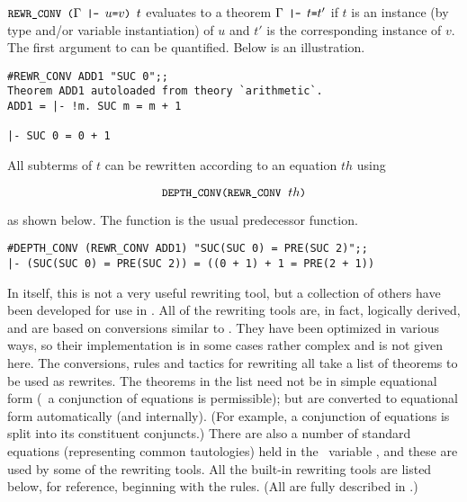 \noindent $\ml{REWR\_CONV (}\Gamma\ml{ |- }u \ml{=}v\ml{) }t$ evaluates to a
theorem $\Gamma\ml{ |- }t\ml{=}t'$ 
if $t$ is an instance (by type and/or variable instantiation)
of $u$ and $t'$ is the corresponding instance of $v$. 
The first argument to  can be quantified.
Below is an illustration.

\setcounter{sessioncount}{1}
\begin{session}\begin{verbatim}
#REWR_CONV ADD1 "SUC 0";;
Theorem ADD1 autoloaded from theory `arithmetic`.
ADD1 = |- !m. SUC m = m + 1

|- SUC 0 = 0 + 1
\end{verbatim}\end{session}

\noindent All subterms of $t$ can be rewritten according to
an equation $th$ using

\[ \ml{DEPTH\_CONV(REWR\_CONV}\;\;th\ml{)}  \]

\noindent as shown below. The function  is the usual
predecessor function.

\begin{session}\begin{verbatim}
#DEPTH_CONV (REWR_CONV ADD1) "SUC(SUC 0) = PRE(SUC 2)";;
|- (SUC(SUC 0) = PRE(SUC 2)) = ((0 + 1) + 1 = PRE(2 + 1))
\end{verbatim}\end{session}

In itself, this is not a very useful rewriting tool, but a collection
of others have been developed for use in \HOL.
All of the rewriting tools are, in fact, logically derived, and are
based on conversions similar to . 
They have been optimized in various ways, so their
implementation is in some cases rather complex and is not given here.
The conversions, rules and tactics for rewriting all take a list of
theorems
to be used as rewrites.
The theorems in the list need not be in simple equational form
(\eg\ a conjunction of equations is permissible); but are
converted to equational form
automatically (and internally).
(For example, a conjunction of equations is split into
its constituent conjuncts.)  There are also a number 
of standard equations (representing common tautologies) held in
the \ML\ variable
, and these
are used by some of the rewriting tools. All the
built-in rewriting tools are listed below, for
reference, beginning with the rules. 
(All are fully
described in \REFERENCE.)

